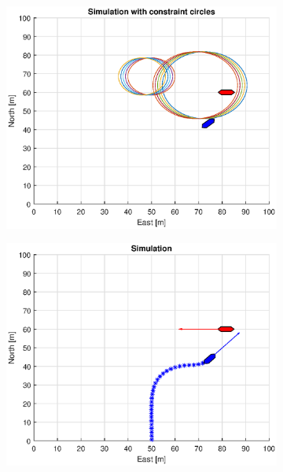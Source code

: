 \begin{figure}[ht]\ContinuedFloat
    \begin{subfigure}[b]{0.49\textwidth}
        \centering
        \includegraphics[width=\textwidth]{Images/Figures/Enkel_GW/Simple0_f1_Frame4}
    \end{subfigure}
    \hfill
    \begin{subfigure}[b]{0.499\textwidth}
        \centering
        \includegraphics[width=\textwidth]{Images/Figures/Enkel_GW/Simple0_f600_Frame4}

\end{subfigure}
\end{figure}
